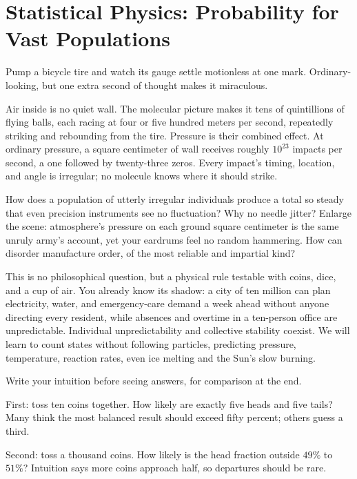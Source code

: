 \chapter[Statistical Physics: Vast Populations]{Statistical Physics: Probability for Vast Populations}


Pump a bicycle tire and watch its gauge settle motionless at one mark. Ordinary-looking, but one extra second of thought makes it miraculous.

Air inside is no quiet wall. The molecular picture makes it tens of quintillions of flying balls, each racing at four or five hundred meters per second, repeatedly striking and rebounding from the tire. Pressure is their combined effect. At ordinary pressure, a square centimeter of wall receives roughly \(10^{23}\) impacts per second, a one followed by twenty-three zeros. Every impact's timing, location, and angle is irregular; no molecule knows where it should strike.

How does a population of utterly irregular individuals produce a total so steady that even precision instruments see no fluctuation? Why no needle jitter? Enlarge the scene: atmosphere's pressure on each ground square centimeter is the same unruly army's account, yet your eardrums feel no random hammering. How can disorder manufacture order, of the most reliable and impartial kind?

This is no philosophical question, but a physical rule testable with coins, dice, and a cup of air. You already know its shadow: a city of ten million can plan electricity, water, and emergency-care demand a week ahead without anyone directing every resident, while absences and overtime in a ten-person office are unpredictable. Individual unpredictability and collective stability coexist. We will learn to count states without following particles, predicting pressure, temperature, reaction rates, even ice melting and the Sun's slow burning.


Write your intuition before seeing answers, for comparison at the end.

First: toss ten coins together. How likely are exactly five heads and five tails? Many think the most balanced result should exceed fifty percent; others guess a third.

Second: toss a thousand coins. How likely is the head fraction outside \(49\%\) to \(51\%\)? Intuition says more coins approach half, so departures should be rare.

